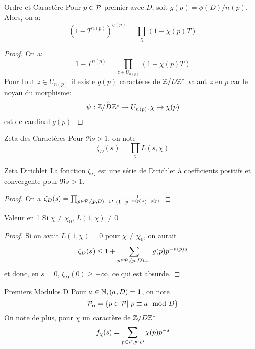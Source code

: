 \documentclass{cours}
\begin{document}
\begin{lemme}
	{Ordre et Caractère}{}
	Pour $p \in \mathcal{P}$ premier avec $D$, soit $g(p) = \phi(D) / n(p)$. Alors, on a:
	\begin{equation*}
		(1 - T^{n(p)})^{g(p)} = \prod_{\chi}(1 - \chi(p)T)
	\end{equation*}
\end{lemme}
\begin{proof}
	On a: 
	\begin{equation*}
		1 - T^{n(p)} = \prod_{z \in U_{n(p)}} (1 - \chi(p) T)
	\end{equation*}
	Pour tout $z \in U_{n(p)}$ il existe $g(p)$ caractères de $\mathbb{Z}/D\mathbb{Z}^{*}$ valant $z$ en $p$ car le noyau du morphisme: 
	\begin{equation*}
		\psi: \hat{\mathbb{Z}/D\mathbb{Z}^{*}} \to U_{n(p)}, \chi \mapsto \chi(p)
	\end{equation*}
	est de cardinal $g(p)$. 
\end{proof}

\begin{définition}
	{Zeta des Caractères}{}
	Pour $\Re s > 1$, on note 
	\begin{equation*}
		\zeta_{D}(s) = \prod_{\chi} L(s, \chi)
	\end{equation*}
\end{définition}

\begin{propositionfr}
	{Zeta Dirichlet}{}
	La fonction $\zeta_{D}$ est une série de Dirichlet à coefficients positifs et convergente pour $\Re s > 1$. 
\end{propositionfr}

\begin{proof}
	On a $\zeta_{D}(s) = \prod_{p \in \mathcal{P}, (p, D) = 1}, \frac{1}{(1 - p^{-n(p)s})^{-g(p)}}$
\end{proof}

\begin{théorème}
	{Valeur en 1}{}
	Si $\chi \neq \chi_{0}$, $L(1, \chi) \neq 0$
\end{théorème}
\begin{proof}
	Si on avait $L(1, \chi) = 0$ pour $\chi \neq \chi_{0}$, on aurait
	\begin{equation*}
		\zeta_{D}(s) \leq 1 + \sum_{p \in \mathcal{P}, (p, D) = 1} g(p)p^{-n(p)s}
	\end{equation*}
	et donc, en $s = 0$, $\zeta_{D}(0) \geq + \infty$, ce qui est absurde. 
\end{proof}

\begin{définition}
	{Premiers Modulos D}{}
	Pour $a \in \mathbb{N}, (a, D) = 1$, on note
	\begin{equation*}
		\mathcal{P}_{a} = \left\{p \in \mathcal{P} \middle|\ p \equiv a \mod D\right\}
	\end{equation*}
	On note de plus, pour $\chi$ un caractère de $\mathbb{Z}/D\mathbb{Z}^{*}$
	\begin{equation*}
		f_{\chi}(s) = \sum_{p\in \mathcal{P}, p \nmid D} \chi(p)p^{-s}
	\end{equation*}
\end{définition}
\end{document}
